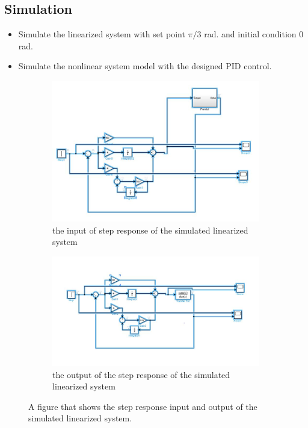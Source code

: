 \documentclass[12pt]{article}
\begin{document}
\subsection*{Simulation}

\begin{itemize}
  \item Simulate the linearized system with set point $\pi/3$ rad. and initial condition 0 rad.
  \item Simulate the nonlinear system model with the designed PID control.
\end{itemize}

\begin{figure}[H]
\centering
\begin{subfigure}{0.5\textwidth}
  \centering
  \includegraphics[width=1\linewidth]{images/ulin_simu.jpg}
  \caption{the input of step response of the simulated linearized system} \label{my_input_step_li}
\end{subfigure}%
\begin{subfigure}{0.5\textwidth}
  \centering
  \includegraphics[width=1\linewidth]{images/lin_simu.jpg}
  \caption{the output of the step response of the simulated linearized system} \label{my_output_step_li}
\end{subfigure}
\caption{A figure that shows the step response input and output of the simulated linearized system.}
\label{fig:step_li}
\end{figure}
\end{document}
